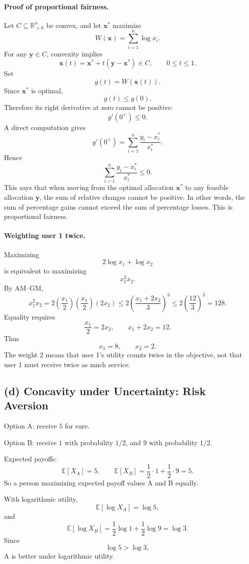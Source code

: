 \documentclass[11pt,a4paper]{article}
\begin{document}
\paragraph{Proof of proportional fairness.}
Let \(C\subseteq \mathbb R_{>0}^n\) be convex, and let \(\mathbf x^*\)
maximize
\[
W(\mathbf x)=\sum_{i=1}^n \log x_i.
\]
For any \(\mathbf y\in C\), convexity implies
\[
\mathbf x(t)=\mathbf x^*+t(\mathbf y-\mathbf x^*)\in C,\qquad 0\le t\le 1.
\]
Set
\[
g(t)=W(\mathbf x(t)).
\]
Since \(\mathbf x^*\) is optimal,
\[
g(t)\le g(0).
\]
Therefore its right derivative at zero cannot be positive:
\[
g'(0^+)\le 0.
\]
A direct computation gives
\[
g'(0^+)=\sum_{i=1}^n \frac{y_i-x_i^*}{x_i^*}.
\]
Hence
\[
\sum_{i=1}^n \frac{y_i-x_i^*}{x_i^*}\le 0.
\]
This says that when moving from the optimal allocation \(\mathbf x^*\) to
any feasible allocation \(\mathbf y\), the sum of relative changes cannot
be positive. In other words, the sum of percentage gains cannot exceed the
sum of percentage losses. This is proportional fairness.

\paragraph{Weighting user 1 twice.}
Maximizing
\[
2\log x_1+\log x_2
\]
is equivalent to maximizing
\[
x_1^2x_2.
\]
By AM--GM,
\[
x_1^2x_2
=2\left(\frac{x_1}{2}\right)\left(\frac{x_1}{2}\right)(2x_2)
\le 2\left(\frac{x_1+2x_2}{3}\right)^3
\le 2\left(\frac{12}{3}\right)^3=128.
\]
Equality requires
\[
\frac{x_1}{2}=2x_2,\qquad x_1+2x_2=12.
\]
Thus
\[
x_1=8,\qquad x_2=2.
\]
The weight \(2\) means that user 1's utility counts twice in the objective,
not that user 1 must receive twice as much service.

\subsection*{(d) Concavity under Uncertainty: Risk Aversion}

Option A: receive \(5\) for sure.

Option B: receive \(1\) with probability \(1/2\), and \(9\) with
probability \(1/2\).

Expected payoffs:
\[
\mathbb E[X_A]=5,\qquad
\mathbb E[X_B]=\frac12\cdot 1+\frac12\cdot 9=5.
\]
So a person maximizing expected payoff values A and B equally.

With logarithmic utility,
\[
\mathbb E[\log X_A]=\log 5,
\]
and
\[
\mathbb E[\log X_B]
=\frac12\log 1+\frac12\log 9
=\log 3.
\]
Since
\[
\log 5>\log 3,
\]
A is better under logarithmic utility.
\end{document}
